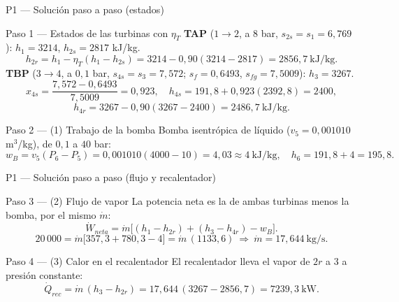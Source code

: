 \documentclass[aspectratio=169,10pt]{beamer}
\begin{document}
\begin{frame}{P1 --- Solución paso a paso (estados)}
\begin{cardgear}{Paso 1 --- Estados de las turbinas con $\eta_T$}{\faSuperscript}
{\footnotesize
\textbf{TAP} ($1\to2$, a $8$ bar, $s_{2s}=s_1=6{,}769$): $h_1=3214$, $h_{2s}=2817$ kJ/kg.
$$h_{2r}=h_1-\eta_T(h_1-h_{2s})=3214-0{,}90(3214-2817)=2856{,}7\ \text{kJ/kg}.$$
\textbf{TBP} ($3\to4$, a $0{,}1$ bar, $s_{4s}=s_3=7{,}572$; $s_f=0{,}6493$, $s_{fg}=7{,}5009$): $h_3=3267$.
$$x_{4s}=\frac{7{,}572-0{,}6493}{7{,}5009}=0{,}923,\quad h_{4s}=191{,}8+0{,}923(2392{,}8)=2400,$$
$$h_{4r}=3267-0{,}90(3267-2400)=2486{,}7\ \text{kJ/kg}.$$}
\end{cardgear}
\vspace{1.2mm}
\begin{cardidea}{Paso 2 --- (1) Trabajo de la bomba}{\faListOl}
Bomba isentrópica de líquido ($v_5=0{,}001010$ m$^3$/kg), de $0{,}1$ a $40$ bar:
$$w_B=v_5(P_6-P_5)=0{,}001010(4000-10)=4{,}03\approx 4\ \text{kJ/kg},\quad h_6=191{,}8+4=195{,}8.$$
\end{cardidea}
\end{frame}

\begin{frame}{P1 --- Solución paso a paso (flujo y recalentador)}
\begin{cardidea}{Paso 3 --- (2) Flujo de vapor}{\faListOl}
La potencia neta es la de ambas turbinas menos la bomba, por el mismo $\dot m$:
$$\dot W_{neta}=\dot m\big[(h_1-h_{2r})+(h_3-h_{4r})-w_B\big].$$
$$20\,000=\dot m\big[357{,}3+780{,}3-4\big]=\dot m\,(1133{,}6)\ \Rightarrow\ \dot m=17{,}644\ \text{kg/s}.$$
\end{cardidea}
\vspace{1.4mm}
\begin{cardgear}{Paso 4 --- (3) Calor en el recalentador}{\faListOl}
El recalentador lleva el vapor de $2r$ a $3$ a presión constante:
$$\dot Q_{rec}=\dot m\,(h_3-h_{2r})=17{,}644\,(3267-2856{,}7)=7239{,}3\ \text{kW}.$$
\end{cardgear}
\end{frame}
\end{document}

